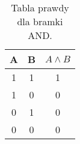 \begin{table}[htbp]
\centering
\begin{tabular}{|c|c|c|}
\hline
A & B & $A\wedge B$ \\ \hline
1 & 1 & 1   \\ \hline
1 & 0 & 0   \\ \hline
0 & 1 & 0   \\ \hline
0 & 0 & 0   \\ \hline
\end{tabular}
\label{tab:and}
\caption{Tabla prawdy dla bramki AND.}
\end{table}